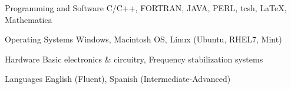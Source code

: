 

\begin{cvskills}

    \cvskill
        {Programming and Software} %
        {C/C++, FORTRAN, JAVA, PERL, tcsh, \LaTeX, Mathematica} %

\cvskill
{Operating Systems} %
{Windows, Macintosh OS, Linux (Ubuntu, RHEL7, Mint)}

\cvskill
{Hardware} %
{Basic electronics \& circuitry, Frequency stabilization systems} %

  \cvskill
    {Languages} %
{English (Fluent), Spanish (Intermediate-Advanced)} %

\end{cvskills}
